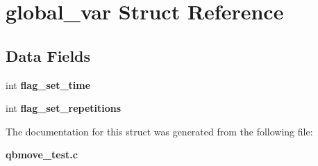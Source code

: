 \section{global\+\_\+var Struct Reference}
\label{structglobal__var}
\subsection*{Data Fields}
\begin{DoxyCompactItemize}
\item 
\mbox{\label{structglobal__var_a085c28d6493b324a90e58ea1b9f0c9e2}} 
int {\bfseries flag\+\_\+set\+\_\+time}
\item 
\mbox{\label{structglobal__var_a9e8101269e0ff94ba2ec010275363894}} 
int {\bfseries flag\+\_\+set\+\_\+repetitions}
\end{DoxyCompactItemize}


The documentation for this struct was generated from the following file\+:\begin{DoxyCompactItemize}
\item 
\textbf{ qbmove\+\_\+test.\+c}\end{DoxyCompactItemize}
